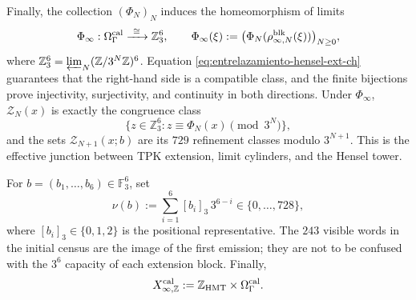 Finally, the collection \((\Phi_N)_N\) induces the homeomorphism of limits
\begin{equation}
 \Phi_\infty:\Omega_\Gamma^{\rm cal}
 \xrightarrow{\ \cong\ }\mathbb Z_3^6,\qquad
 \Phi_\infty(\xi):=
 \bigl(\Phi_N(\rho^{\rm blk}_{\infty,N}(\xi))\bigr)_{N\ge0},
 \label{eq:phi-infinito-hensel-ext-ch}
\end{equation}
where
\(\mathbb Z_3^6=\varprojlim_N(\mathbb Z/3^N\mathbb Z)^6\).
Equation \eqref{eq:entrelazamiento-hensel-ext-ch} guarantees that the
right-hand side is a compatible class, and the finite bijections prove
injectivity, surjectivity, and continuity in both directions. Under
\(\Phi_\infty\), \(\mathscr Z_N(x)\) is exactly the congruence class
\[
 \{z\in\mathbb Z_3^6:z\equiv\Phi_N(x)\pmod{3^N}\},
\]
and the sets \(\mathscr Z_{N+1}(x;b)\) are its \(729\) refinement classes
modulo \(3^{N+1}\). This is the effective junction between TPK extension,
limit cylinders, and the Hensel tower.

For \(b=(b_1,\ldots,b_6)\in\mathbb F_3^6\), set
\[
 \nu(b):=\sum_{i=1}^{6}[b_i]_3\,3^{6-i}
 \in\{0,\ldots,728\},
\tag{C.40c$_0$}
\label{eq:valor-bloque-ch}
\]
where \([b_i]_3\in\{0,1,2\}\) is the positional representative. The
\(243\) visible words in the initial census are the image of the first
emission; they are not to be confused with the \(3^6\) capacity of each
extension block. Finally,
\[
 X_{\infty,\mathbb Z}^{\rm cal}
 :=\mathbb Z_{\rm HMT}\times\Omega_\Gamma^{\rm cal}.
\]
